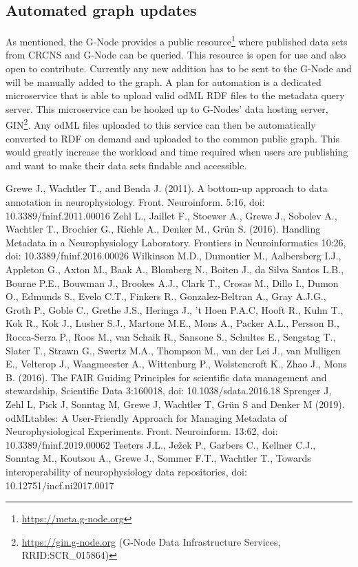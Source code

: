 \documentclass{article}
\begin{document}
\subsection{Automated graph updates}\label{sec:outlook_gin_integration}
As mentioned, the G-Node provides a public resource\footnote{\url{https://meta.g-node.org}} where published data sets from CRCNS and G-Node can be queried. This resource is open for use and also open to contribute. Currently any new addition has to be sent to the G-Node and will be manually added to the graph. A plan for automation is a dedicated microservice that is able to upload valid odML RDF files to the metadata query server. This microservice can be hooked up to G-Nodes' data hosting server, GIN\footnote{\url{https://gin.g-node.org} (G-Node Data Infrastructure Services, RRID:SCR\_015864)}. Any odML files uploaded to this service can then be automatically converted to RDF on demand and uploaded to the common public graph. This would greatly increase the workload and time required when users are publishing and want to make their data sets findable and accessible.

\begin{thebibliography}{}
Grewe J., Wachtler T., and Benda J. (2011). A bottom-up approach to data annotation in neurophysiology. Front. Neuroinform. 5:16, doi: 10.3389/fninf.2011.00016
Zehl L., Jaillet F., Stoewer A., Grewe J., Sobolev A., Wachtler T., Brochier G., Riehle A., Denker M., Grün S. (2016). Handling Metadata in a Neurophysiology Laboratory. Frontiers in Neuroinformatics 10:26, doi: 10.3389/fninf.2016.00026
Wilkinson M.D., Dumontier M., Aalbersberg I.J., Appleton G., Axton M., Baak A., Blomberg N., Boiten J., da Silva Santos L.B., Bourne P.E., Bouwman J., Brookes A.J., Clark T., Crosas M., Dillo I., Dumon O., Edmunds S., Evelo C.T., Finkers R., Gonzalez-Beltran A., Gray A.J.G., Groth P., Goble C., Grethe J.S., Heringa J., ’t Hoen P.A.C, Hooft R., Kuhn T., Kok R., Kok J., Lusher S.J., Martone M.E., Mons A., Packer A.L., Persson B., Rocca-Serra P., Roos M., van Schaik R., Sansone S., Schultes E., Sengstag T., Slater T., Strawn G., Swertz M.A., Thompson M., van der Lei J., van Mulligen E., Velterop J., Waagmeester A., Wittenburg P., Wolstencroft K., Zhao J., Mons B. (2016). The FAIR Guiding Principles for scientific data management and stewardship, Scientific Data 3:160018, doi: 10.1038/sdata.2016.18
Sprenger J, Zehl L, Pick J, Sonntag M, Grewe J, Wachtler T, Grün S and Denker M (2019). odMLtables: A User-Friendly Approach for Managing Metadata of Neurophysiological Experiments. Front. Neuroinform. 13:62, doi: 10.3389/fninf.2019.00062
Teeters J.L., Ježek P., Garbers C., Kellner C.J., Sonntag M., Koutsou A., Grewe J., Sommer F.T., Wachtler T., Towards interoperability of neurophysiology data repositories, doi: 10.12751/incf.ni2017.0017
\end{thebibliography}
\end{document}
